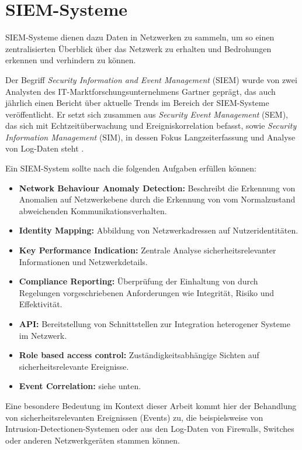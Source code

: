 \section{SIEM-Systeme}

\label{sec_basics_siem}

SIEM-Systeme dienen dazu Daten in Netzwerken zu sammeln, um so einen zentralisierten Überblick über das Netzwerk zu erhalten und Bedrohungen erkennen und verhindern zu können. 

Der Begriff \textit{Security Information and Event Management} (SIEM) wurde von zwei Analysten des IT-Marktforschungsunternehmens Gartner geprägt, das auch jährlich einen Bericht über aktuelle Trends im Bereich der SIEM-Systeme veröffentlicht.
Er setzt sich zusammen aus \textit{Security Event Management} (SEM), das sich mit Echtzeitüberwachung und Ereigniskorrelation befasst, sowie \textit{Security Information Management} (SIM), in dessen Fokus Langzeiterfassung und Analyse von Log-Daten steht \cite{gartner2011}. 

Ein SIEM-System sollte nach \cite{detken2015} die folgenden Aufgaben erfüllen können: 
\begin{itemize}
	\item \textbf{Network Behaviour Anomaly Detection:} Beschreibt die Erkennung von Anomalien auf Netzwerkebene durch die Erkennung von vom Normalzustand abweichenden Kommunikationsverhalten.
	\item \textbf{Identity Mapping:} Abbildung von Netzwerkadressen auf Nutzeridentitäten. 
	\item \textbf{Key Performance Indication:} Zentrale Analyse sicherheitsrelevanter Informationen und Netzwerkdetails.
	\item \textbf{Compliance Reporting:} Überprüfung der Einhaltung von durch Regelungen vorgeschriebenen Anforderungen wie Integrität, Risiko und Effektivität.
	\item \textbf{API:} Bereitstellung von Schnittstellen zur Integration heterogener Systeme im Netzwerk.
	\item \textbf{Role based access control:} Zuständigkeitsabhängige Sichten auf sicherheitsrelevante Ereignisse.
  \item \textbf{Event Correlation:} siehe unten.
\end{itemize} 

Eine besondere Bedeutung im Kontext dieser Arbeit kommt hier der Behandlung von sicherheitsrelevanten Ereignissen (Events) zu, die beispielsweise von Intrusion-Detectionen-Systemen oder aus den Log-Daten von Firewalls, Switches oder anderen Netzwerkgeräten stammen können. 

